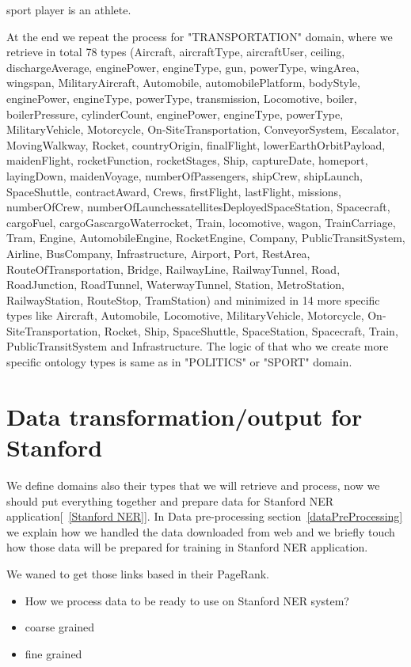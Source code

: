 \documentclass[thesis=M,english]{FITthesis}[2018/05/30]
\begin{document}
sport player is an athlete.

At the end we repeat the process for "TRANSPORTATION" domain, where we retrieve in total 78 types (Aircraft, aircraftType, aircraftUser, ceiling, dischargeAverage, enginePower, engineType, gun, powerType, wingArea, wingspan, MilitaryAircraft, Automobile, automobilePlatform, bodyStyle, enginePower, engineType, powerType, transmission, Locomotive, boiler, boilerPressure, cylinderCount, enginePower, engineType, powerType, MilitaryVehicle, Motorcycle, On-SiteTransportation, ConveyorSystem, Escalator, MovingWalkway, Rocket, countryOrigin, finalFlight, lowerEarthOrbitPayload, maidenFlight, rocketFunction, rocketStages, Ship, captureDate, homeport, layingDown, maidenVoyage, numberOfPassengers, shipCrew, shipLaunch, SpaceShuttle, contractAward, Crews, firstFlight, lastFlight, missions, numberOfCrew, numberOfLaunchessatellitesDeployedSpaceStation, Spacecraft, cargoFuel, cargoGascargoWaterrocket, Train, locomotive, wagon, TrainCarriage, Tram, Engine, AutomobileEngine, RocketEngine, Company, PublicTransitSystem, Airline, BusCompany, Infrastructure, Airport, Port, RestArea, RouteOfTransportation, Bridge, RailwayLine, RailwayTunnel, Road, RoadJunction, RoadTunnel, WaterwayTunnel, Station, MetroStation, RailwayStation, RouteStop, TramStation) and minimized in 14 more specific types like Aircraft, Automobile, Locomotive, MilitaryVehicle, Motorcycle, On-SiteTransportation, Rocket, Ship, SpaceShuttle, SpaceStation, Spacecraft, Train, PublicTransitSystem and Infrastructure. The logic of that who we create more specific ontology types is same as in "POLITICS" or "SPORT" domain.   



\section{Data transformation/output for Stanford}\label{StanfordNERoutput}
We define domains also their types that we will retrieve and process, now we should put everything together and prepare data for Stanford NER application[~\ref{Stanford NER}]. In Data pre-processing section~\ref{dataPreProcessing} we explain how we handled the data downloaded from web and we briefly touch how those data will be prepared for training in Stanford NER application. 

We waned to get those links based in their PageRank\cite{wiki:PageRank}.  

 
\begin{itemize}
	\item How we process data to be ready to use on Stanford NER system?
	\item coarse grained
	\item fine grained
\end{itemize}
\end{document}
